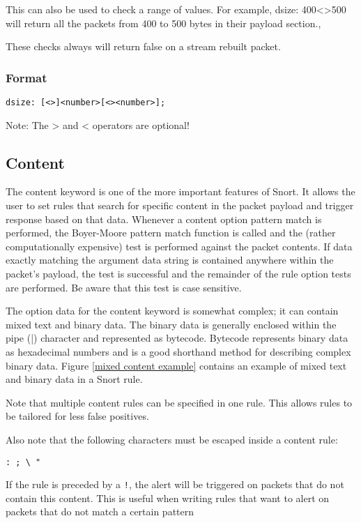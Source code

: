 \documentclass[english]{report}
\begin{document}
This can also be used to check a range of values. For example, dsize:
400<>500 will return all the packets from 400 to 500 bytes in their
payload section.,

These checks always will return false on a stream rebuilt packet.


\subsubsection{Format}

\begin{verbatim}
dsize: [<>]<number>[<><number>];
\end{verbatim}
Note: The > and < operators are optional!

\subsection{Content\label{sub:Content}}

The content keyword is one of the more important features of Snort.
It allows the user to set rules that search for specific content in
the packet payload and trigger response based on that data. Whenever
a content option pattern match is performed, the Boyer-Moore pattern
match function is called and the (rather computationally expensive)
test is performed against the packet contents. If data exactly matching
the argument data string is contained anywhere within the packet's
payload, the test is successful and the remainder of the rule option
tests are performed. Be aware that this test is case sensitive.

The option data for the content keyword is somewhat complex; it can
contain mixed text and binary data. The binary data is generally enclosed
within the pipe (|) character and represented
as bytecode. Bytecode represents binary data as hexadecimal numbers
and is a good shorthand method for describing complex binary data.
Figure \ref{mixed content example} contains an example of mixed text
and binary data in a Snort rule. 

Note that multiple content rules can be specified in one rule. This
allows rules to be tailored for less false positives. 

Also note that the following characters must be escaped inside a content
rule:

\begin{verbatim}
: ; \ "
\end{verbatim}
If the rule is preceded by a \texttt{!}, the alert will be triggered
on packets that do not contain this content. This is useful when writing
rules that want to alert on packets that do not match a certain pattern
\end{document}
